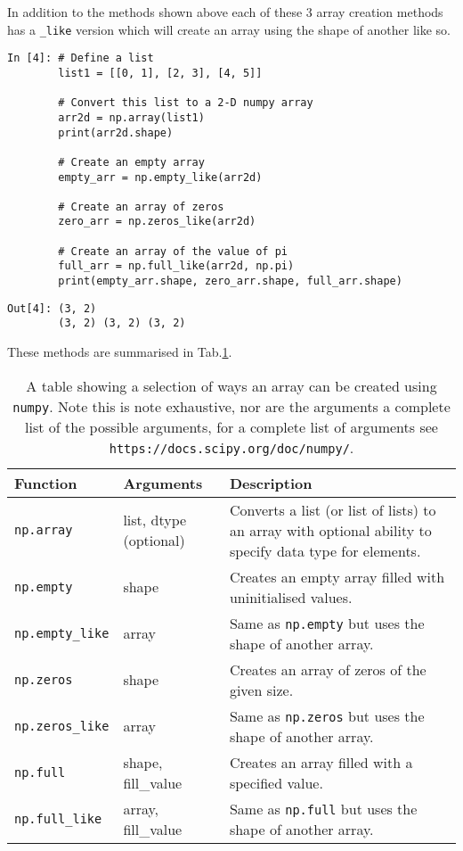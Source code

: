 \newpage

In addition to the methods shown above each of these 3 array creation methods has a \texttt{\_like} version which will create an array using the shape of another like so.

\begin{lstlisting}[style=PY]
In [4]: # Define a list
        list1 = [[0, 1], [2, 3], [4, 5]]
        
        # Convert this list to a 2-D numpy array
        arr2d = np.array(list1)
        print(arr2d.shape)
        
        # Create an empty array
        empty_arr = np.empty_like(arr2d)
        
        # Create an array of zeros
        zero_arr = np.zeros_like(arr2d)
        
        # Create an array of the value of pi
        full_arr = np.full_like(arr2d, np.pi)
        print(empty_arr.shape, zero_arr.shape, full_arr.shape)
\end{lstlisting}
\begin{lstlisting}[style=PY, backgroundcolor=\color{white}]
Out[4]: (3, 2)
        (3, 2) (3, 2) (3, 2)
\end{lstlisting}

These methods are summarised in Tab.\ref{tab:arrc}.

\begin{table}[H]
\begin{tabularx}{\textwidth}{|X|X|X|}
    \hline
     Function & Arguments & Description \\
     \hline
     \texttt{np.array} & list, dtype (optional) & Converts a list (or list of lists) to an array with optional ability to specify data type for elements. \\ 
     \hline
     \texttt{np.empty} & shape & Creates an empty array filled with uninitialised values.\\
     \hline
     \texttt{np.empty\_like} & array & Same as \texttt{np.empty} but uses the shape of another array. \\
     \hline
     \texttt{np.zeros} & shape & Creates an array of zeros of the given size.\\
     \hline
     \texttt{np.zeros\_like} & array & Same as \texttt{np.zeros} but uses the shape of another array. \\
     \hline
     \texttt{np.full} & shape, fill\_value & Creates an array filled with a specified value.\\
     \hline
     \texttt{np.full\_like} & array, fill\_value & Same as \texttt{np.full} but uses the shape of another array. \\
     \hline
\end{tabularx}
\caption{A table showing a selection of ways an array can be created using \texttt{numpy}. Note this is note exhaustive, nor are the arguments a complete list of the possible arguments, for a complete list of arguments see \texttt{https://docs.scipy.org/doc/numpy/}.}
\label{tab:arrc}
\end{table}

